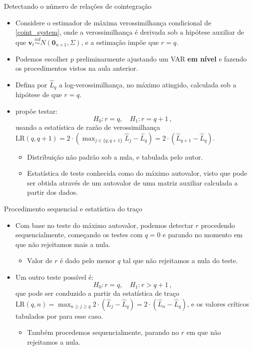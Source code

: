 \documentclass[11pt]{beamer}
\newenvironment{halfwideitemize}{\itemize\addtolength{\itemsep}{0.5em}}{\enditemize}
\begin{document}
\begin{frame}{Detectando o número de relações de cointegração}
	\begin{itemize}
		\item Considere o estimador de máxima verossimilhança condicional de \eqref{coint_system}, onde a verossimilhança é derivada sob a hipótese auxiliar de que $\boldsymbol{v}_t \overset{iid}{\sim} N(\boldsymbol{0}_{n\times 1}, \Sigma)$, e a estimação impõe que $r=q$.
		\begin{halfwideitemize}
			\item Podemos escolher $p$ preliminarmente ajustando um VAR \textbf{em nível} e fazendo os procedimentos vistos na aula anterior.
		\end{halfwideitemize}
								\item Defina por  $\hat{L}_q$ a log-verossimilhança, no máximo atingido, calculada sob a hipótese de que $r=q$.
		\item \citet{Johansen1991} propõe testar:
		$$H_0 : r= q, \quad H_1: r= q+1\, ,$$
		usando a estatística de razão de verossimilhança $\text{LR}(q,q+1) = 2 \cdot (\max_{j \in \{q,q+1\}} \hat L_{j} - \hat L_q)  = 2 \cdot ( \hat L_{q+1} - \hat L_q)$.
		\begin{itemize}
			\item Distribuição não padrão sob a nula, e tabulada pelo autor.
			\item Estatística de teste conhecida como do {\color{blue}máximo autovalor}, visto que pode ser obtida através de um autovalor de uma matriz auxiliar calculada a partir dos dados.
		\end{itemize}
				
	\end{itemize}
\end{frame}
\begin{frame}{Procedimento sequencial e estatística do traço}
	\begin{itemize}
				\item Com base no teste do máximo autovalor, podemos detectar $r$ procedendo sequencialmente, começando os testes com $q=0$ e parando no momento em que não rejeitamos mais a nula.
				\begin{itemize}
					\item Valor de $r$ é dado pelo menor $q$ tal que não rejeitamos a nula do teste.
				\end{itemize} 
	 		\item Um outro teste possível é:
		$$H_0 : r= q, \quad H_1: r> q+1 \, ,$$
		que pode ser conduzido a partir da {\color{blue}estatística de traço} $\text{LR}(q,n) = \max_{n\geq j\geq q}2 \cdot ( \hat L_{j} - \hat L_q)= 2 \cdot ( \hat L_{n} - \hat L_q)$, e os valores críticos tabulados por \citet{Johansen1991} para esse caso.
		\begin{itemize}
			\item Também procedemos sequencialmente, parando no $r$ em que não rejeitamos a nula. 
		\end{itemize}
	\end{itemize}
\end{frame}
\end{document}
